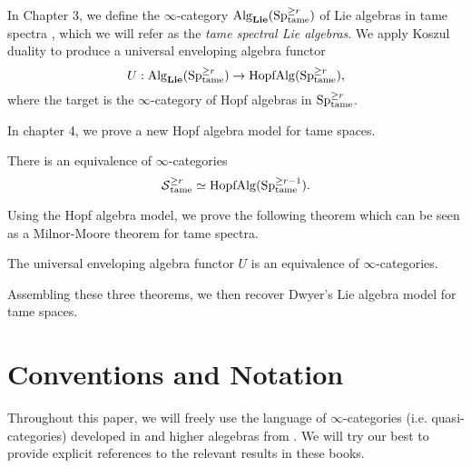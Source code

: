 In Chapter 3, we define the $\infty$-category $\operatorname{Alg}_{\mathbf{Lie}}(\operatorname{Sp}^{\geq r}_{\operatorname{\operatorname{tame}}})$ of Lie algebras in tame spectra , which we will refer as the \emph{tame spectral Lie algebras}.
We apply Koszul duality to produce a universal enveloping algebra functor
$$
U:\operatorname{Alg}_{\mathbf{Lie}}(\operatorname{Sp}^{\geq r}_{\operatorname{\operatorname{tame}}}) \to \operatorname{HopfAlg}(\operatorname{Sp}^{\geq r}_{\operatorname{\operatorname{tame}}}),
$$ 
where the target is the $\infty$-category of Hopf algebras in $\operatorname{Sp}^{\geq r}_{\operatorname{\operatorname{tame}}}$. 

In chapter 4, we prove a new Hopf algebra model for tame spaces.
\begin{thmx}
\label{Theorem C}
There is an equivalence of $\infty$-categories 
$$
\operatorname{\mathcal{S}}^{\geq r}_{\operatorname{\operatorname{tame}}} 
\simeq
\operatorname{HopfAlg}(\operatorname{Sp}^{\geq r-1}_{\operatorname{\operatorname{tame}}}).
$$
\end{thmx}
Using the Hopf algebra model, we prove the following theorem which can be seen as a Milnor-Moore theorem for tame spectra.
\begin{thmx}
The universal enveloping algebra functor $U$ is an equivalence of $\infty$-categories.
\end{thmx}

Assembling these three theorems, we then recover Dwyer's Lie algebra model for tame spaces.




\section{Conventions and Notation}
Throughout this paper, we will freely use the language of $\infty$-categories (i.e. quasi-categories) developed in \cite{HTT} and higher alegebras from \cite{HA}.
We will try our best to provide explicit references to the relevant results in these books.

